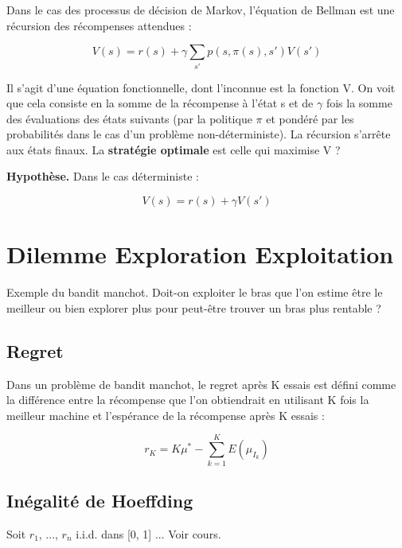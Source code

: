 \documentclass{article}
\begin{document}
Dans le cas des processus de décision de Markov, l'équation de Bellman est une récursion des récompenses attendues :

\[ V(s) = r(s) + \gamma \sum_{s'} p(s, \pi(s), s') V(s') \]

Il s'agit d'une équation fonctionnelle, dont l'inconnue est la fonction V. On voit que cela consiste en la somme de la récompense à l'état s et de $\gamma$ fois la somme des évaluations des états suivants (par la politique $\pi$ et pondéré par les probabilités dans le cas d'un problème non-déterministe). La récursion s'arrête aux états finaux. La \textbf{stratégie optimale} est celle qui maximise V ?

\textbf{Hypothèse.} Dans le cas déterministe : 

\[ V(s) = r(s) + \gamma V(s') \]

\section{Dilemme Exploration Exploitation}

Exemple du bandit manchot. Doit-on exploiter le bras que l'on estime être le meilleur ou bien explorer plus pour peut-être trouver un bras plus rentable ?

\subsection*{Regret}

Dans un problème de bandit manchot, le regret après K essais est défini comme la différence entre la récompense que l'on obtiendrait en utilisant K fois la meilleur machine et l'espérance de la récompense après K essais :

\[ r_K = K\mu^* - \sum_{k=1}^K E(\mu_{I_k}) \]

\subsection*{Inégalité de Hoeffding}

Soit $r_1$, ..., $r_n$ i.i.d. dans [0, 1] ... Voir cours.
\end{document}

